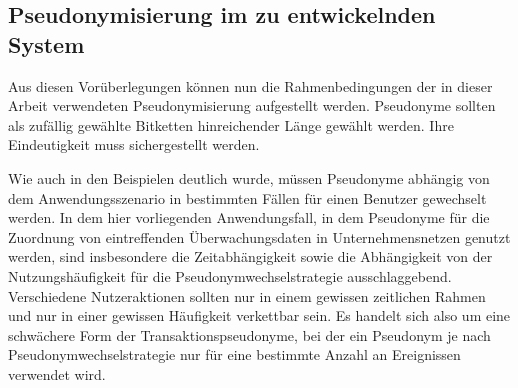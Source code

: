 \subsection{Pseudonymisierung im zu entwickelnden System}


Aus diesen Vorüberlegungen können nun die Rahmenbedingungen der in dieser Arbeit verwendeten Pseudonymisierung aufgestellt werden.
Pseudonyme sollten als zufällig gewählte Bitketten hinreichender Länge gewählt werden. Ihre Eindeutigkeit muss sichergestellt werden.

Wie auch in den Beispielen deutlich wurde, müssen Pseudonyme abhängig von dem Anwendungsszenario in bestimmten Fällen für einen Benutzer gewechselt werden. In dem hier vorliegenden Anwendungsfall, in dem Pseudonyme für die Zuordnung von eintreffenden Überwachungsdaten in Unternehmensnetzen genutzt werden, sind insbesondere die Zeitabhängigkeit sowie die Abhängigkeit von der Nutzungshäufigkeit für die Pseudonymwechselstrategie ausschlaggebend. Verschiedene Nutzeraktionen sollten nur in einem gewissen zeitlichen Rahmen und nur in einer gewissen Häufigkeit verkettbar sein. Es handelt sich also um eine schwächere Form der Transaktionspseudonyme, bei der ein Pseudonym je nach Pseudonymwechselstrategie nur für eine bestimmte Anzahl an Ereignissen verwendet wird.

